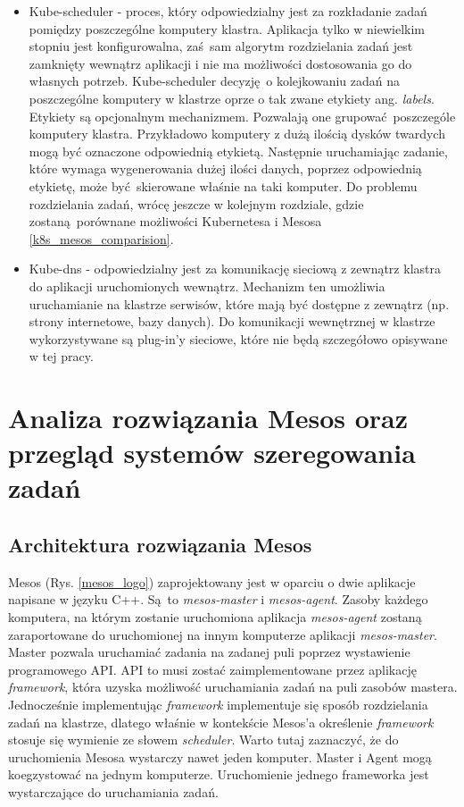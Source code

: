 \documentclass[10pt,a4paper,titlepage,twoside]{report}
\begin{document}
\begin{itemize}
\item Kube-scheduler - proces, który odpowiedzialny jest za rozkładanie zadań pomiędzy poszczególne komputery klastra. Aplikacja tylko w niewielkim stopniu jest konfigurowalna, zaś sam algorytm rozdzielania zadań jest zamknięty wewnątrz aplikacji i nie ma możliwości dostosowania go do własnych potrzeb. Kube-scheduler decyzję o kolejkowaniu zadań na poszczególne komputery w klastrze oprze o tak zwane etykiety ang. \textit{labels}. Etykiety są opcjonalnym mechanizmem. Pozwalają one grupować poszczególe komputery klastra. Przykładowo komputery z dużą ilością dysków twardych mogą być oznaczone odpowiednią etykietą. Następnie uruchamiając zadanie, które wymaga wygenerowania dużej ilości danych, poprzez odpowiednią etykietę, może być skierowane właśnie na taki komputer. Do problemu rozdzielania zadań, wrócę jeszcze w kolejnym rozdziale, gdzie zostaną porównane możliwości Kubernetesa i Mesosa \ref{k8s_mesos_comparision}.
\item Kube-dns - odpowiedzialny jest za komunikację sieciową z zewnątrz klastra do aplikacji uruchomionych wewnątrz. Mechanizm ten umożliwia uruchamianie na klastrze serwisów, które mają być dostępne z zewnątrz (np. strony internetowe, bazy danych). Do komunikacji wewnętrznej w klastrze wykorzystywane są plug-in'y sieciowe, które nie będą szczegółowo opisywane w tej pracy.
\end{itemize}

\onehalfspacing
\chapter{Analiza rozwiązania Mesos oraz przegląd systemów szeregowania zadań}

\section{Architektura rozwiązania Mesos}

Mesos (Rys. \ref{mesos_logo}) zaprojektowany jest w oparciu o dwie aplikacje napisane w języku C++. Są to \textit{mesos-master} i \textit{mesos-agent}. Zasoby każdego komputera, na którym zostanie uruchomiona aplikacja \textit{mesos-agent} zostaną zaraportowane do uruchomionej na innym komputerze aplikacji \textit{mesos-master}. Master pozwala uruchamiać zadania na zadanej puli poprzez wystawienie programowego API. API to musi zostać zaimplementowane przez aplikację \textit{framework}, która uzyska możliwość uruchamiania zadań na puli zasobów mastera. Jednocześnie implementując \textit{framework} implementuje się sposób rozdzielania zadań na klastrze, dlatego właśnie w kontekście Mesos'a określenie \textit{framework} stosuje się wymienie ze słowem \textit{scheduler}. Warto tutaj zaznaczyć, że do uruchomienia Mesosa wystarczy nawet jeden komputer. Master i Agent mogą koegzystować na jednym komputerze. Uruchomienie jednego frameworka jest wystarczające do uruchamiania zadań. 
\end{document}
